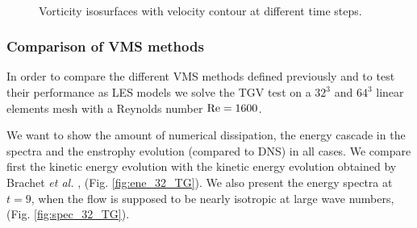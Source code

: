 \begin{figure}[h!]
  \\
  \caption{Vorticity isosurfaces with velocity contour at different time steps.}
  \label{fig:isovor_vel_TG}
\end{figure}

\subsubsection{Comparison of VMS methods}

In order to compare the different VMS methods defined previously and to test their performance as LES models
we solve the TGV test on a $32^3$ and $64^3$ linear elements mesh with a Reynolds number ${\rm Re}=1600$. 

We want to show the amount of numerical dissipation, the energy cascade in the spectra and the enstrophy evolution (compared to DNS) in all cases. We compare first the kinetic energy evolution  with the kinetic energy evolution obtained by Brachet \emph{et al.} \cite{brachet_small-scale_1983}, (Fig. \ref{fig:ene_32_TG}). We also present the energy spectra at $t=9$, when the flow is supposed to be nearly isotropic at large wave numbers, (Fig. \ref{fig:spec_32_TG}).

